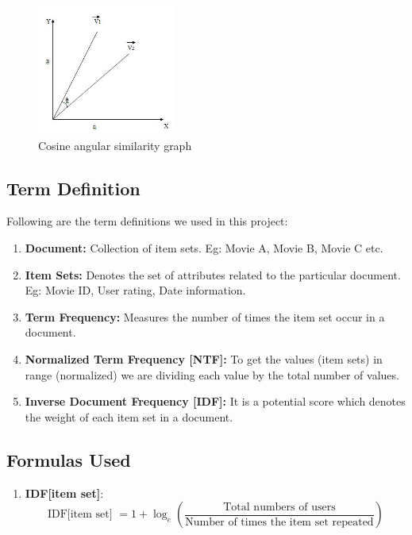 \documentclass[12pt, titlepage, onecolumn]{article}
\begin{document}
{\begin{figure}[h!]
  \centering
    \includegraphics[width=0.4\textwidth]{graph}
      \caption{Cosine angular similarity graph}
\end{figure}

\subsection{Term Definition}
Following are the term definitions we used in this project:
\begin{enumerate}
	\item{\bf Document: }Collection of item sets. Eg: Movie A, Movie B, Movie C etc.
	
	\item {\bf Item Sets: } Denotes the set of attributes related to the particular document. Eg: Movie ID, User rating, Date information.
	
	\item{\bf Term Frequency: } Measures the number of times the item set occur in a document.
	
	\item{\bf Normalized Term Frequency [NTF]: }To get the values (item sets) in range (normalized) we are dividing each value by the total number of values.
	
	\item {\bf Inverse Document Frequency [IDF]: }It is a potential score which denotes the weight of each item set in a document.
\end{enumerate}

\subsection{Formulas Used}
\label{sec: formulas}
\begin{enumerate}
	\item{\bf IDF[item set]}:
	\label{itm: idf_item}
		\begin{equation}
			\text{IDF[item set] }= 1 + \log_{e} ( \frac{\text{Total numbers of users}}{\text{Number of times the item set repeated}})
		\end{equation}
	

\end{enumerate}}
\end{document}
